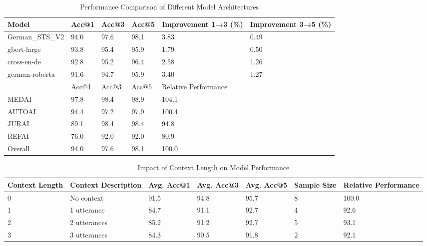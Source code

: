 
\begin{table}[htbp]
\centering
\caption{Performance Comparison of Different Model Architectures}
\label{tab:model_performance}
\begin{tabularx}{\textwidth}{lXXXXX}
\toprule
Model & Acc@1 & Acc@3 & Acc@5 & Improvement 1→3 (\%) & Improvement 3→5 (\%) \\
\midrule
German\_STS\_V2 & 94.0 & 97.6 & 98.1 & 3.83 & 0.49 \\
gbert-large & 93.8 & 95.4 & 95.9 & 1.79 & 0.50 \\
cross-en-de & 92.8 & 95.2 & 96.4 & 2.58 & 1.26 \\
german-roberta & 91.6 & 94.7 & 95.9 & 3.40 & 1.27 \\
\bottomrule
\end{tabular}
\end{table}

\begin{table}[htbp]
\centering
\caption{Performance Across Different Scenarios (Best Model: German\_STS\_V2)}
\label{tab:scenario_performance}
\begin{tabularx}{\textwidth}{lXXXX}
\toprule
Scenario & Acc@1 & Acc@3 & Acc@5 & Relative Performance \\
\midrule
MEDAI & 97.8 & 98.4 & 98.9 & 104.1 \\
AUTOAI & 94.4 & 97.2 & 97.9 & 100.4 \\
JURAI & 89.1 & 98.4 & 98.4 & 94.8 \\
REFAI & 76.0 & 92.0 & 92.0 & 80.9 \\
Overall & 94.0 & 97.6 & 98.1 & 100.0 \\
\bottomrule
\end{tabularx}
\end{table}

\begin{table}[htbp]
\centering
\caption{Impact of Context Length on Model Performance}
\label{tab:context_impact}
\begin{tabularx}{\textwidth}{lXXXXXX}
\toprule
Context Length & Context Description & Avg. Acc@1 & Avg. Acc@3 & Avg. Acc@5 & Sample Size & Relative Performance \\
\midrule
0 & No context & 91.5 & 94.8 & 95.7 & 8 & 100.0 \\
1 & 1 utterance & 84.7 & 91.1 & 92.7 & 4 & 92.6 \\
2 & 2 utterances & 85.2 & 91.2 & 92.7 & 5 & 93.1 \\
3 & 3 utterances & 84.3 & 90.5 & 91.8 & 2 & 92.1 \\
\bottomrule
\end{tabularx}
\end{table}

